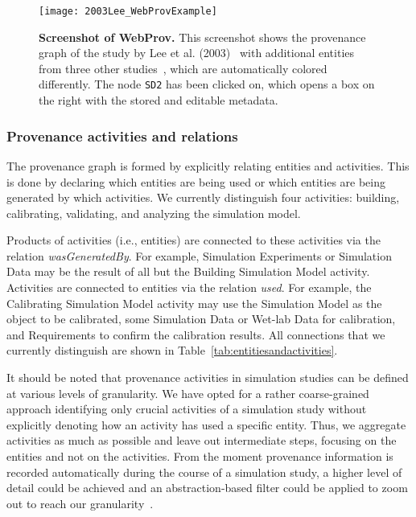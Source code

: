 \documentclass[10pt,letterpaper]{article}
\newcommand{\lee}{Lee et al. (2003)}
\newcommand{\Rs}{Requirements}
\newcommand{\SM}{Simulation Model}
\newcommand{\SEs}{Simulation Experiments}
\newcommand{\SD}{Simulation Data}
\newcommand{\WD}{Wet-lab Data}
\newcommand{\BSM}{Building Simulation Model}
\newcommand{\CSM}{Calibrating Simulation Model}
\begin{document}
\begin{figure}[!h]%
\begin{adjustwidth}{-2.25in}{0in}
\centering
\texttt{[image: 2003Lee\_WebProvExample]}
\caption{{\bf Screenshot of WebProv.}
This screenshot shows the provenance graph of the study by \lee{}~\cite{Lee2003} with additional entities from three other studies~\cite{Lee2001, Dajani2003, Salic2000}, which are automatically colored differently.
The node \texttt{SD2} has been clicked on, which opens a box on the right with the stored and editable metadata.}
\label{fig:WebProvLee}
\end{adjustwidth}
\end{figure}


\subsubsection*{Provenance activities and relations}

The provenance graph is formed by explicitly relating entities and activities.
This is done by declaring which entities are being used or which entities are being generated by which activities.
We currently distinguish four activities: building, calibrating, validating, and analyzing the simulation model.

Products of activities (i.e., entities) are connected to these activities via the relation \textit{wasGeneratedBy}.
For example, \SEs{} or \SD{} may be the result of all but the \BSM{} activity.
Activities are connected to entities via the relation \textit{used}.
For example, the \CSM{} activity may use the \SM{} as the object to be calibrated, some \SD{} or \WD{} for calibration, and \Rs{} to confirm the calibration results.
All connections that we currently distinguish are shown in Table~\ref{tab:entitiesandactivities}.

It should be noted that provenance activities in simulation studies can be defined at various levels of granularity.
We have opted for a rather coarse-grained approach identifying only crucial activities of a simulation study without explicitly denoting how an activity has used a specific entity.
Thus, we aggregate activities as much as possible and leave out intermediate steps, focusing on the entities and not on the activities.
From the moment provenance information is recorded automatically during the course of a simulation study, a higher level of detail could be achieved and an abstraction-based filter could be applied to zoom out to reach our granularity~\cite{Ruscheinski2019}.
\end{document}
